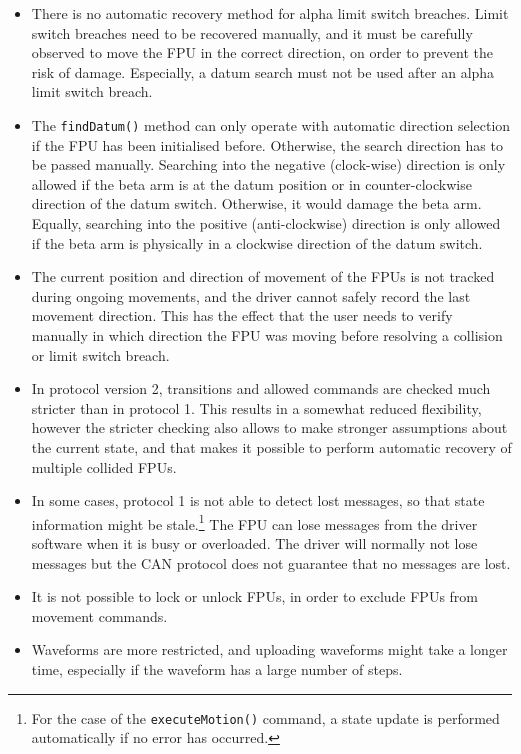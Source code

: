 \documentclass[11pt,a4paper]{scrartcl}
\begin{document}
\begin{itemize}
\item There is no automatic recovery method for alpha
  limit switch breaches. Limit switch breaches need
  to be recovered manually, and it must be carefully
  observed to move the FPU in the correct direction,
  on order to prevent the risk of damage. Especially,
  a datum search must not be used after an alpha limit switch
  breach. 

\item The \texttt{findDatum()} method can only operate with automatic
  direction selection if the FPU has been initialised before.
  Otherwise, the search direction has to be passed manually.
  Searching into the negative (clock-wise) direction is only allowed
  if the beta arm is at the datum position or in counter-clockwise
  direction of the datum switch. Otherwise, it would damage the beta
  arm.  Equally, searching into the positive (anti-clockwise)
  direction is only allowed if the beta arm is physically in a
  clockwise direction of the datum switch.

\item The current position and direction of movement of the FPUs is
  not tracked during ongoing movements, and the driver cannot safely
  record the last movement direction. This has the effect that the
  user needs to verify manually in which direction the FPU was moving
  before resolving a collision or limit switch breach.

\item In protocol version 2, transitions and allowed commands are
  checked much stricter than in protocol 1.  This results in a
  somewhat reduced flexibility, however the stricter checking also
  allows to make stronger assumptions about the current state, and
  that makes it possible to perform automatic recovery of multiple
  collided FPUs.
  
\item In some cases, protocol 1 is not able to detect lost messages,
  so that state information might be stale.\footnote{For the case of
    the \texttt{executeMotion()} command, a state update is performed
    automatically if no error has occurred.} The FPU can lose messages
  from the driver software when it is busy or overloaded. The driver
  will normally not lose messages but the CAN protocol does not
  guarantee that no messages are lost.
  

\item It is not possible to lock or unlock FPUs, in order to exclude
  FPUs from movement commands.
  
\item Waveforms are more restricted, and uploading waveforms might
  take a longer time, especially if the waveform has a large number of
  steps.
  
\end{itemize}
\end{document}
